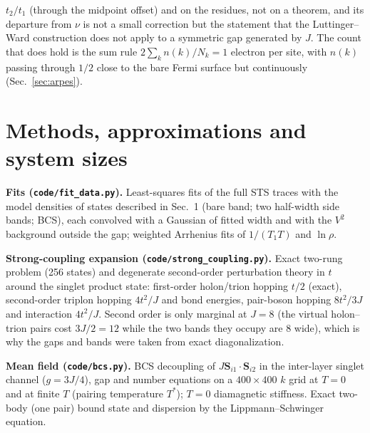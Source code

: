\documentclass[11pt]{article}
\begin{document}
$t_2/t_1$ (through the midpoint offset) and on the residues, not on a theorem, and its departure from $\nu$ is not a small correction but the statement that the Luttinger--Ward construction does not apply to a symmetric gap generated by $J$. The count that does hold is the sum rule $2\sum_kn(k)/N_k=1$ electron per site, with $n(k)$ passing through $1/2$ close to the bare Fermi surface but continuously (Sec.~\ref{sec:arpes}).

\section{Methods, approximations and system sizes}

\textbf{Fits (\texttt{code/fit\_data.py}).} Least-squares fits of the full STS traces with the model densities of states described in Sec.~1 (bare band; two half-width side bands; BCS), each convolved with a Gaussian of fitted width and with the $V^2$ background outside the gap; weighted Arrhenius fits of $1/(T_1T)$ and $\ln\rho$.

\textbf{Strong-coupling expansion (\texttt{code/strong\_coupling.py}).} Exact two-rung problem (256 states) and degenerate second-order perturbation theory in $t$ around the singlet product state: first-order holon/trion hopping $t/2$ (exact), second-order triplon hopping $4t^2/J$ and bond energies, pair-boson hopping $8t^2/3J$ and interaction $4t^2/J$. Second order is only marginal at $J=8$ (the virtual holon--trion pairs cost $3J/2=12$ while the two bands they occupy are $8$ wide), which is why the gaps and bands were taken from exact diagonalization.

\textbf{Mean field (\texttt{code/bcs.py}).} BCS decoupling of $J\mathbf S_{i1}\!\cdot\!\mathbf S_{i2}$ in the inter-layer singlet channel ($g=3J/4$), gap and number equations on a $400\times400$ $k$ grid at $T=0$ and at finite $T$ (pairing temperature $T^*$); $T=0$ diamagnetic stiffness. Exact two-body (one pair) bound state and dispersion by the Lippmann--Schwinger equation.
\end{document}
